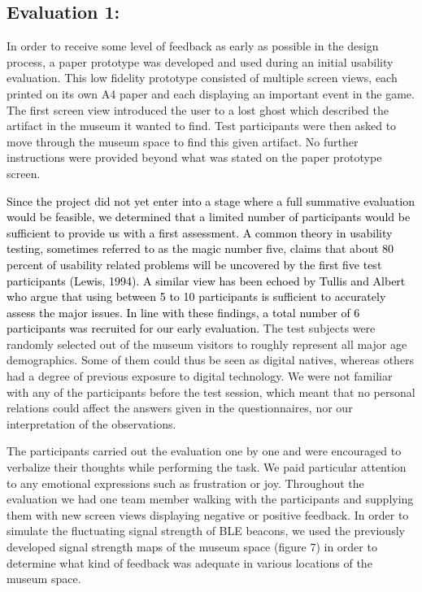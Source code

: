 \documentclass[prodmode,acmtomm]{acmsmall}
\begin{document}
\subsection{Evaluation 1: }
In order to receive some level of feedback as early as possible in the design process, a paper prototype was developed and used during an initial usability evaluation. 
This low fidelity prototype consisted of multiple screen views, each printed on its own A4 paper and each displaying an important event in the game. The first screen view introduced the user to a lost ghost which described the artifact in the museum it wanted to find. Test participants were then asked to move through the museum space to find this given artifact. No further instructions were provided beyond what was stated on the paper prototype screen. 

\textcolor{black}{
Since the project did not yet enter into a stage where a full summative evaluation would be feasible, we determined that a limited number of participants would be sufficient to provide us with a first assessment. A common theory in usability testing, sometimes referred to as the magic number five, claims that about 80 percent of usability related problems will be uncovered by the first five test participants (Lewis, 1994). A similar view has been echoed by Tullis and Albert\cite{tullis2008} who argue that using between 5 to 10 participants is sufficient to accurately assess the major issues. In line with these findings, a total number of 6 participants was recruited for our early evaluation. }
The test subjects were randomly selected out of the museum visitors to roughly represent all major age demographics. Some of them could thus be seen as digital natives, whereas others had a degree of previous exposure to digital technology. We were not familiar with any of the participants before the test session, which meant that no personal relations could affect the answers given in the questionnaires, nor our interpretation of the observations. 

The participants carried out the evaluation one by one and were encouraged to verbalize their thoughts while performing the task. We paid particular attention to any emotional expressions such as frustration or joy. Throughout the evaluation we had one team member walking with the participants and supplying them with new screen views displaying negative or positive feedback. In order to simulate the fluctuating signal strength of BLE beacons, we used the previously developed signal strength maps of the museum space (figure 7) in order to determine what kind of feedback was adequate in various locations of the museum space. 
\end{document}
